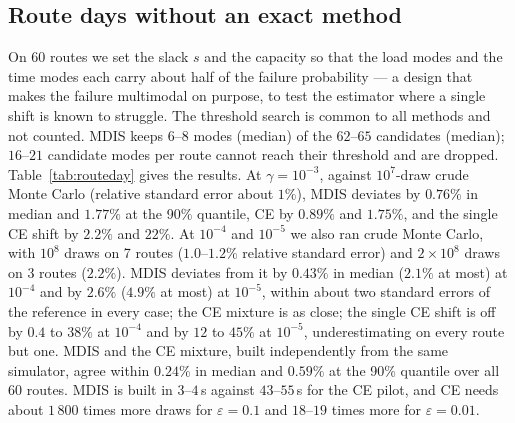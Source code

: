 \documentclass[ijoc,sglanonrev]{informs4}
\begin{document}
\begin{APPENDICES}
\section{Route days without an exact method}
\label{sec:routeday}
On 60 routes we set the slack $s$ and the capacity so that the load modes and
the time modes each carry about half of the failure probability --- a design
that makes the failure multimodal on purpose, to test the estimator where a
single shift is known to struggle. The threshold search is common to all
methods and not counted. MDIS keeps $6$--$8$ modes (median) of the $62$--$65$
candidates (median); $16$--$21$ candidate modes per route cannot reach their threshold
and are dropped. Table~\ref{tab:routeday} gives the results. At
$\gamma=10^{-3}$, against $10^7$-draw crude Monte Carlo (relative standard
error about $1\%$), MDIS deviates by $0.76\%$ in median and $1.77\%$ at the 90\%
quantile, CE by $0.89\%$ and $1.75\%$, and the single CE shift by $2.2\%$ and
$22\%$. At $10^{-4}$ and $10^{-5}$ we also ran crude Monte Carlo, with $10^8$
draws on 7 routes ($1.0$--$1.2\%$ relative standard error) and $2\times10^8$
draws on 3 routes ($2.2\%$). MDIS deviates from it by $0.43\%$ in median
($2.1\%$ at most) at $10^{-4}$ and by $2.6\%$ ($4.9\%$ at most) at $10^{-5}$,
within about two standard errors of the reference in every case; the CE
mixture is as close; the single CE shift is off by $0.4$ to $38\%$ at
$10^{-4}$ and by $12$ to $45\%$ at $10^{-5}$, underestimating on every route
but one. MDIS and the CE mixture, built independently from the same
simulator, agree within $0.24\%$ in median and $0.59\%$ at the 90\%
quantile over all 60 routes. MDIS is built in $3$--$4$\,s against
$43$--$55$\,s for the CE pilot, and CE needs about $1\,800$ times more draws for
$\varepsilon=0.1$ and $18$--$19$ times more for $\varepsilon=0.01$.

\begin{table}[t]
\centering\small
\caption{Route-day simulator, 60 routes: deviation (median / 90\% quantile),
relative variance (median), build time (median).}
\label{tab:routeday}
\end{table}



\end{APPENDICES}
\end{document}
